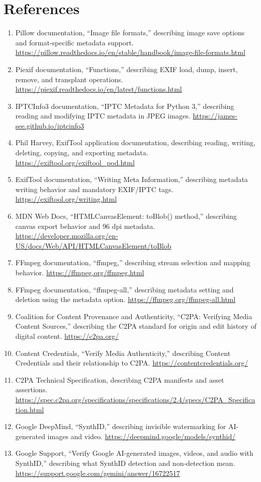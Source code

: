 \section*{References}
\begin{enumerate}
    \item[{[1]}] Pillow documentation, ``Image file formats,'' describing image save options and format-specific metadata support. \url{https://pillow.readthedocs.io/en/stable/handbook/image-file-formats.html}
    \item[{[2]}] Piexif documentation, ``Functions,'' describing EXIF load, dump, insert, remove, and transplant operations. \url{https://piexif.readthedocs.io/en/latest/functions.html}
    \item[{[3]}] IPTCInfo3 documentation, ``IPTC Metadata for Python 3,'' describing reading and modifying IPTC metadata in JPEG images. \url{https://james-see.github.io/iptcinfo3}
    \item[{[4]}] Phil Harvey, ExifTool application documentation, describing reading, writing, deleting, copying, and exporting metadata. \url{https://exiftool.org/exiftool_pod.html}
    \item[{[5]}] ExifTool documentation, ``Writing Meta Information,'' describing metadata writing behavior and mandatory EXIF/IPTC tags. \url{https://exiftool.org/writing.html}
    \item[{[6]}] MDN Web Docs, ``HTMLCanvasElement: toBlob() method,'' describing canvas export behavior and 96 dpi metadata. \url{https://developer.mozilla.org/en-US/docs/Web/API/HTMLCanvasElement/toBlob}
    \item[{[7]}] FFmpeg documentation, ``ffmpeg,'' describing stream selection and mapping behavior. \url{https://ffmpeg.org/ffmpeg.html}
    \item[{[8]}] FFmpeg documentation, ``ffmpeg-all,'' describing metadata setting and deletion using the metadata option. \url{https://ffmpeg.org/ffmpeg-all.html}
    \item[{[9]}] Coalition for Content Provenance and Authenticity, ``C2PA: Verifying Media Content Sources,'' describing the C2PA standard for origin and edit history of digital content. \url{https://c2pa.org/}
    \item[{[10]}] Content Credentials, ``Verify Media Authenticity,'' describing Content Credentials and their relationship to C2PA. \url{https://contentcredentials.org/}
    \item[{[11]}] C2PA Technical Specification, describing C2PA manifests and asset assertions. \url{https://spec.c2pa.org/specifications/specifications/2.4/specs/C2PA_Specification.html}
    \item[{[12]}] Google DeepMind, ``SynthID,'' describing invisible watermarking for AI-generated images and video. \url{https://deepmind.google/models/synthid/}
    \item[{[13]}] Google Support, ``Verify Google AI-generated images, videos, and audio with SynthID,'' describing what SynthID detection and non-detection mean. \url{https://support.google.com/gemini/answer/16722517}
\end{enumerate}
